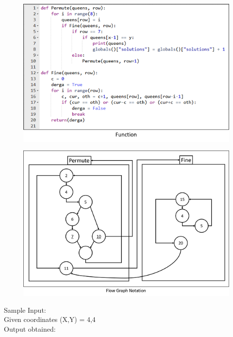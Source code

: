 \documentclass[10pt,a4paper]{article}
\begin{document}
		\begin{figure}[h!]
			\centering
			\includegraphics{quee.png}
			\end{figure}	
			
			\begin{figure}[h!]
				\centering
				\includegraphics{qu.png}
				\end{figure}
				
				\noindent
				Sample Input:\\
				Given coordinates (X,Y) = 4,4\\
				\noindent
				Output obtained:\\
				
\end{document}
